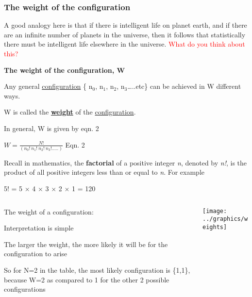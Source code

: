 \documentclass[ignorenonframetext]{beamer}
\begin{document}
\begin{frame}[allowframebreaks=0.7]
\frametitle{The weight of the configuration}
A good analogy here is that if there is intelligent life on planet earth, and if there are an infinite number of planets in the universe, then it follows that statistically there must be intelligent life elsewhere in the universe. \textcolor{red}{What do you think about this?}\par\hrulefill\medskip


\textbf{The weight of the configuration, W}
 
Any general \underline{configuration} \{ n\(_0\), n\(_1\), n\(_2\), n\(_3\)…..etc\} can be achieved in W different ways.\par\smallskip
 
W is called the \underline{\textbf{weight}} of the \underline{configuration}.\par\smallskip
 
In general, W is given by eqn. 2\par\medskip
 
\begin{center} \(W = \frac{N!}{(n_0!\  n_1!\  n_2!\  n_3! …..)}\)    Eqn. 2\end{center}\par\medskip
 
Recall in mathematics, the \textbf{factorial} of a positive integer \textit{n}, denoted by \textit{n!}, is the product of all positive integers less than or equal to \textit{n}. For example\par\smallskip

\begin{center}5! = 5 × 4 × 3 × 2 × 1 = 120\end{center}
\end{frame}


\begin{frame}
\begin{columns}[onlytextwidth]
\begin{column}{.4\textwidth}
The weight of a configuration:\par
Interpretation is simple\par
The larger the weight, the more likely it will be for the configuration to arise	\par\medskip
So for N=2 in the table, the most likely configuration is \{1,1\}, because W=2 as compared to 1 for the other 2 possible configurations
\end{column}
\begin{column}{.6\textwidth}
\texttt{[image: ../graphics/weights]}
\end{column}
\end{columns}
\end{frame}
\end{document}
